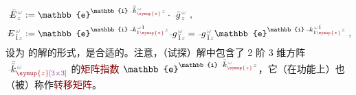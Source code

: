 \begin{subequations} \label{eq:matrix_exp}
\begin{align}
	\Xint{\mathcolor{gray}{-}}{30}{\bar{E}}^{\;\!\mathcolor{gray}{\omega}}_{\;\! \mathcolor{gray}{z}} &:= \mathbb{e}^{\mathbb{i} \Xint{\begin{smallmatrix} ~ \\ {}^{}_{\mathcolor{gray}{-}} \\ ~ \end{smallmatrix}}{15}{\bar{\bar{k}}}_{\textcolor{Maroon}{\symup{z}}}^{\;\! \mathcolor{gray}{\omega}} \mathcolor{gray}{z}} \cdot \Xint{{}^{}_{\mathcolor{gray}{-}}}{10}{\bar{g}}^{\;\!\mathcolor{gray}{\omega}}_{\;\! \mathcolor{gray}{z}} ~, \label{eq:vec-matrix_exp} \\
	\Xint{\mathcolor{gray}{-}}{30}{E}^{\;\!\mathcolor{gray}{\omega}}_{\;\! \hat{1} \mathcolor{gray}{z}} &:= \mathbb{e}^{\mathbb{i} \Xint{\begin{smallmatrix} ~ \\ {}^{}_{\mathcolor{gray}{-}} \\ ~ \end{smallmatrix}}{15}{k}_{\hat{1} \textcolor{Maroon}{\symup{z}}}^{\;\! \mathcolor{gray}{\omega} \breve{1}} \mathcolor{gray}{z}} \Xint{{}^{}_{\mathcolor{gray}{-}}}{10}{g}^{\;\!\mathcolor{gray}{\omega}}_{\;\! \breve{1} \mathcolor{gray}{z}} = \Xint{{}^{}_{\mathcolor{gray}{-}}}{10}{g}^{\;\!\mathcolor{gray}{\omega}}_{\;\! \breve{1} \mathcolor{gray}{z}} \mathbb{e}^{\mathbb{i} \Xint{\begin{smallmatrix} ~ \\ {}^{}_{\mathcolor{gray}{-}} \\ ~ \end{smallmatrix}}{15}{k}_{\hat{1} \textcolor{Maroon}{\symup{z}}}^{\;\! \mathcolor{gray}{\omega} \breve{1}} \mathcolor{gray}{z}} ~, \label{eq:components-matrix_exp}
\end{align}
\end{subequations}
设为  的解的形式，是合适的\cite{xieAnalytic3DVector}。注意，（试探）解中包含了 2 阶 3 维方阵 $\Xint{\begin{smallmatrix} ~ \\ {}^{}_{\mathcolor{gray}{-}} \\ ~ \end{smallmatrix}}{15}{\bar{\bar{k}}}_{\textcolor{Maroon}{\symup{z}}\textcolor{Plum}{\left[3 \times 3\right]}}^{\;\! \mathcolor{gray}{\omega}}$ 的\textcolor{Maroon}{矩阵指数} $\mathbb{e}^{\mathbb{i} \Xint{\begin{smallmatrix} ~ \\ {}^{}_{\mathcolor{gray}{-}} \\ ~ \end{smallmatrix}}{15}{\bar{\bar{k}}}_{\textcolor{Maroon}{\symup{z}}}^{\;\! \mathcolor{gray}{\omega}} \mathcolor{gray}{z}}$\cite{pessoaAvoidingMatrixExponentials2024,molerNineteenDubiousWays2003}，它（在功能上）也（被）称作\textcolor{Maroon}{转移矩阵}。

